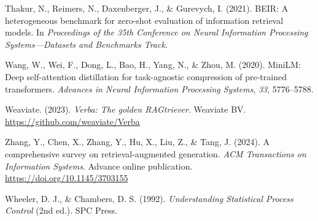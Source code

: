 {Thakur, N., Reimers, N., Daxenberger, J., \& Gurevych, I. (2021). BEIR: A heterogeneous benchmark for zero-shot evaluation of information retrieval models. In \textit{Proceedings of the 35th Conference on Neural Information Processing Systems---Datasets and Benchmarks Track}.

Wang, W., Wei, F., Dong, L., Bao, H., Yang, N., \& Zhou, M. (2020). MiniLM: Deep self-attention distillation for task-agnostic compression of pre-trained transformers. \textit{Advances in Neural Information Processing Systems}, \textit{33}, 5776--5788.

Weaviate. (2023). \textit{Verba: The golden RAGtriever}. Weaviate BV. \url{https://github.com/weaviate/Verba}

Zhang, Y., Chen, X., Zhang, Y., Hu, X., Liu, Z., \& Tang, J. (2024). A comprehensive survey on retrieval-augmented generation. \textit{ACM Transactions on Information Systems}. Advance online publication. \url{https://doi.org/10.1145/3703155}

Wheeler, D. J., \& Chambers, D. S. (1992). \textit{Understanding Statistical Process Control} (2nd ed.). SPC Press.

}
